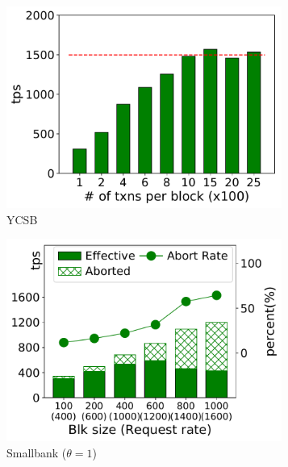 \begin{figure}[tp]
	\centering
    \begin{subfigure}{0.30\textwidth}
      \includegraphics[width=0.99\textwidth]{chart/intro/ycsb.pdf}
      \caption{YCSB}
      \label{chart:intro:basic:ycsb}
    \end{subfigure}
    \begin{subfigure}{0.30\textwidth}
      \includegraphics[width=0.99\textwidth]{chart/intro/smallbank_blk.pdf}
      \caption{Smallbank ($\theta=1$)}
      \label{chart:intro:basic:smallbank_blk}
    \end{subfigure}
    \begin{subfigure}{0.30\textwidth}

\end{subfigure}
\end{figure}
